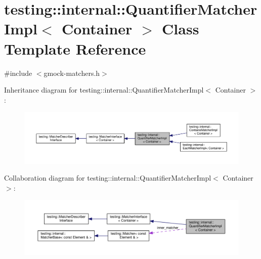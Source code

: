 \hypertarget{classtesting_1_1internal_1_1QuantifierMatcherImpl}{}\section{testing\+:\+:internal\+:\+:Quantifier\+Matcher\+Impl$<$ Container $>$ Class Template Reference}
\label{classtesting_1_1internal_1_1QuantifierMatcherImpl}


{\ttfamily \#include $<$gmock-\/matchers.\+h$>$}



Inheritance diagram for testing\+:\+:internal\+:\+:Quantifier\+Matcher\+Impl$<$ Container $>$\+:
\nopagebreak
\begin{figure}[H]
\begin{center}
\leavevmode
\includegraphics[width=350pt]{classtesting_1_1internal_1_1QuantifierMatcherImpl__inherit__graph}
\end{center}
\end{figure}


Collaboration diagram for testing\+:\+:internal\+:\+:Quantifier\+Matcher\+Impl$<$ Container $>$\+:
\nopagebreak
\begin{figure}[H]
\begin{center}
\leavevmode
\includegraphics[width=350pt]{classtesting_1_1internal_1_1QuantifierMatcherImpl__coll__graph}
\end{center}
\end{figure}
